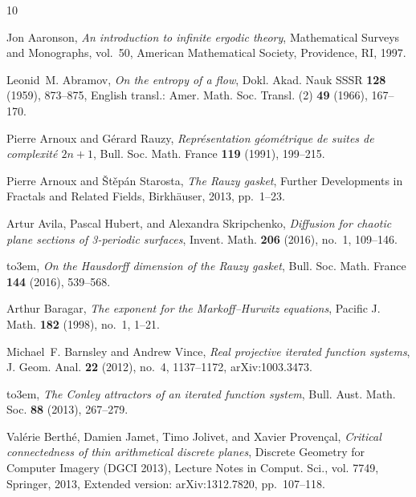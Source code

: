 \documentclass[11pt]{amsart}
\theoremstyle{definition}
\theoremstyle{remark}
\begin{document}
\providecommand{\bysame}{\leavevmode\hbox to3em{\hrulefill}\thinspace}
\providecommand{\MR}{\relax\ifhmode\unskip\space\fi MR }
%
\providecommand{\MRhref}[2]{%
  \href{http://www.ams.org/mathscinet-getitem?mr=#1}{#2}
}
\providecommand{\href}[2]{#2}
\begin{thebibliography}{10}

Jon Aaronson, \emph{An introduction to infinite ergodic theory}, Mathematical
  Surveys and Monographs, vol.~50, American Mathematical Society, Providence,
  RI, 1997.

Leonid~M. Abramov, \emph{On the entropy of a flow}, Dokl. Akad. Nauk SSSR
  \textbf{128} (1959), 873--875, English transl.: Amer. Math. Soc. Transl. (2)
  \textbf{49} (1966), 167--170.

Pierre Arnoux and G{\'e}rard Rauzy, \emph{Repr{\'e}sentation
  g{\'e}om{\'e}trique de suites de complexit{\'e} $2n+1$}, Bull. Soc. Math.
  France \textbf{119} (1991), 199--215.

Pierre Arnoux and {\v{S}}t{\v{e}}p{\'a}n Starosta, \emph{The {R}auzy gasket},
  Further Developments in Fractals and Related Fields, Birkh{\"a}user, 2013,
  pp.~1--23.

Artur Avila, Pascal Hubert, and Alexandra Skripchenko, \emph{Diffusion for
  chaotic plane sections of 3-periodic surfaces}, Invent. Math. \textbf{206}
  (2016), no.~1, 109--146.

\bysame, \emph{On the {H}ausdorff dimension of the {R}auzy gasket}, Bull. Soc.
  Math. France \textbf{144} (2016), 539--568.

Arthur Baragar, \emph{The exponent for the {M}arkoff--{H}urwitz equations},
  Pacific J. Math. \textbf{182} (1998), no.~1, 1--21.

Michael~F. Barnsley and Andrew Vince, \emph{Real projective iterated function
  systems}, J. Geom. Anal. \textbf{22} (2012), no.~4, 1137--1172,
  arXiv:1003.3473.

\bysame, \emph{The {C}onley attractors of an iterated function system}, Bull.
  Aust. Math. Soc. \textbf{88} (2013), 267--279.

Val{\'e}rie Berth{\'e}, Damien Jamet, Timo Jolivet, and Xavier Proven{\c{c}}al,
  \emph{Critical connectedness of thin arithmetical discrete planes}, Discrete
  Geometry for Computer Imagery (DGCI 2013), Lecture Notes in Comput. Sci.,
  vol. 7749, Springer, 2013, Extended version: arXiv:1312.7820, pp.~107--118.


\end{thebibliography}
\end{document}

